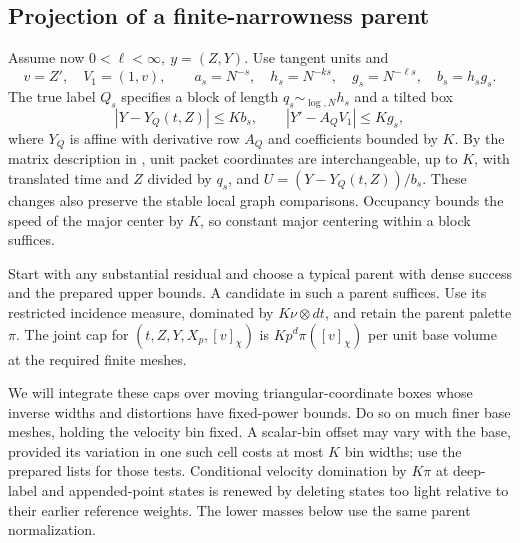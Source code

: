 \subsection{Projection of a finite-narrowness parent}\label{a06:projected-parent}
Assume now \(0<\ell<\infty,\ y=(Z,Y)\). Use tangent units and
\[
 v=Z',\quad V_1=(1,v),\qquad a_s=N^{-s},\quad h_s=N^{-ks},\quad
 g_s=N^{-\ell s},\quad b_s=h_s g_s .
\]
The true label \(Q_s\) specifies a block of length
\(q_s\sim_{\log,N}h_s\) and a tilted box
\[
 |Y-Y_Q(t,Z)|\le Kb_s,\qquad |Y'-A_QV_1|\le Kg_s,
\]
where \(Y_Q\) is affine with derivative row \(A_Q\) and
coefficients bounded by \(K\).  By the matrix description in
, unit packet coordinates are
interchangeable, up to \(K\), with translated time and \(Z\)
divided by \(q_s\), and
\(U=(Y-Y_Q(t,Z))/b_s\).  These changes also preserve the stable
local graph comparisons.  Occupancy bounds the speed of the major
center by \(K\), so constant major centering within a block suffices.

Start with any substantial residual and choose a typical parent
with dense success and the prepared upper bounds.  A candidate in
such a parent suffices.  Use its restricted incidence measure,
dominated by \(K\nu\otimes dt\), and retain the parent palette
\(\pi\).  The joint cap for
\((t,Z,Y,X_p,[v]_\chi)\) is \(Kp^d\pi([v]_\chi)\) per
unit base volume at the required finite meshes.

We will integrate these caps over moving triangular-coordinate
boxes whose inverse widths and distortions have fixed-power bounds.
Do so on much finer base meshes, holding the velocity bin fixed.
A scalar-bin offset may vary with the base, provided its variation
in one such cell costs at most \(K\) bin widths; use the prepared
lists for those tests.  Conditional velocity domination by
\(K\pi\) at deep-label and appended-point states is renewed by
deleting states too light relative to their earlier reference
weights.  The lower masses below use the same parent normalization.

